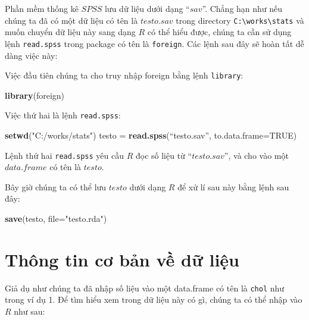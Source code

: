 \documentclass[
]{book}
\newenvironment{Shaded}{\begin{snugshade}}{\end{snugshade}}
\newcommand{\DataTypeTok}[1]{\textcolor[rgb]{0.13,0.29,0.53}{#1}}
\newcommand{\KeywordTok}[1]{\textcolor[rgb]{0.13,0.29,0.53}{\textbf{#1}}}
\newcommand{\NormalTok}[1]{#1}
\newcommand{\OtherTok}[1]{\textcolor[rgb]{0.56,0.35,0.01}{#1}}
\newcommand{\StringTok}[1]{\textcolor[rgb]{0.31,0.60,0.02}{#1}}
\begin{document}
Phần mềm thống kê \(SPSS\) lưu dữ liệu dưới dạng ``\(sav\)''. Chẳng hạn như nếu chúng ta đã có một dữ liệu có tên là \(testo.sav\) trong directory \texttt{C:\textbackslash{}works\textbackslash{}stats} và muốn chuyển dữ liệu này sang dạng \(R\) có thể hiểu được, chúng ta cần sử dụng lệnh \texttt{read.spss} trong package có tên là \texttt{foreign}. Các lệnh sau đây sẽ hoàn tất dễ dàng việc này:

Việc đầu tiên chúng ta cho truy nhập foreign bằng lệnh \texttt{library}:

\begin{Shaded}
\begin{Highlighting}[]
\KeywordTok{library}\NormalTok{(foreign)}
\end{Highlighting}
\end{Shaded}

Việc thứ hai là lệnh \texttt{read.spss}:

\begin{Shaded}
\begin{Highlighting}[]
\KeywordTok{setwd}\NormalTok{(}\StringTok{"C:/works/stats"}\NormalTok{) }
\NormalTok{testo =}\StringTok{ }\KeywordTok{read.spss}\NormalTok{(“testo.sav”, }\DataTypeTok{to.data.frame=}\OtherTok{TRUE}\NormalTok{)}
\end{Highlighting}
\end{Shaded}

Lệnh thứ hai \texttt{read.spss} yêu cầu \(R\) đọc số liệu từ ``\(testo.sav\)'', và cho vào một \(data.frame\) có tên là \(testo\).

Bây giờ chúng ta có thể lưu \(testo\) dưới dạng \(R\) để xử lí sau này bằng lệnh sau đây:

\begin{Shaded}
\begin{Highlighting}[]
\KeywordTok{save}\NormalTok{(testo, }\DataTypeTok{file=}\StringTok{"testo.rda"}\NormalTok{)}
\end{Highlighting}
\end{Shaded}

\hypertarget{thuxf4ng-tin-cux1a1-bux1ea3n-vux1ec1-dux1eef-liux1ec7u}{%
\section{Thông tin cơ bản về dữ liệu}\label{thuxf4ng-tin-cux1a1-bux1ea3n-vux1ec1-dux1eef-liux1ec7u}}

Giả dụ như chúng ta đã nhập số liệu vào một data.frame có tên là \texttt{chol} như trong ví dụ 1. Để tìm hiểu xem trong dữ liệu này có gì, chúng ta có thể nhập vào \(R\) như sau:
\end{document}
